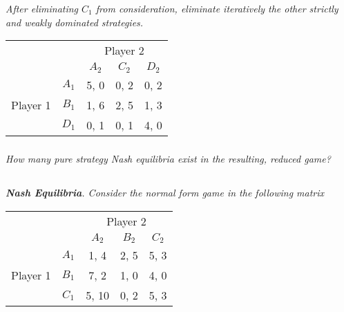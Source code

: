 \documentclass[12pt]{amsart}
\begin{document}
	\subsubsection{}
	\textit{After eliminating $C_1$ from consideration, eliminate iteratively the other strictly and
	weakly dominated strategies.}
	
	\begin{center}
		\def\arraystretch{1.25}%
		\begin{tabular}{ccccc}
			&                            & \multicolumn{3}{c}{Player 2}                                                         \\
			& \multicolumn{1}{c|}{}      & \multicolumn{1}{c|}{$A_2$} & \multicolumn{1}{c|}{$C_2$} & \multicolumn{1}{c|}{$D_2$} \\ \cline{2-5} 
			\multirow{3}{*}{Player 1} & \multicolumn{1}{c|}{$A_1$} & \multicolumn{1}{c|}{5, 0}  & \multicolumn{1}{c|}{0, 2}  & \multicolumn{1}{c|}{0, 2}  \\ \cline{2-5} 
			& \multicolumn{1}{c|}{$B_1$} & \multicolumn{1}{c|}{1, 6}  & \multicolumn{1}{c|}{2, 5}  & \multicolumn{1}{c|}{1, 3}  \\ \cline{2-5} 
			& \multicolumn{1}{c|}{$D_1$} & \multicolumn{1}{c|}{0, 1}  & \multicolumn{1}{c|}{0, 1}  & \multicolumn{1}{c|}{4, 0}  \\ \cline{2-5} 
		\end{tabular}
	\end{center}
 
	\subsubsection{}
	\textit{How many pure strategy Nash equilibria exist in the resulting, reduced game?}




\subsection{}
\textit{\textbf{Nash Equilibria}. Consider the normal form game in the following matrix}

\begin{center}
	\def\arraystretch{1.25}%
	\begin{tabular}{ccccc}
		&                            & \multicolumn{3}{c}{Player 2}                                                         \\
		& \multicolumn{1}{c|}{}      & \multicolumn{1}{c|}{$A_2$} & \multicolumn{1}{c|}{$B_2$} & \multicolumn{1}{c|}{$C_2$} \\ \cline{2-5} 
		& \multicolumn{1}{c|}{$A_1$} & \multicolumn{1}{c|}{1, 4}  & \multicolumn{1}{c|}{2, 5}  & \multicolumn{1}{c|}{5, 3}  \\ \cline{2-5} 
		Player 1 & \multicolumn{1}{c|}{$B_1$} & \multicolumn{1}{c|}{7, 2}  & \multicolumn{1}{c|}{1, 0}  & \multicolumn{1}{c|}{4, 0}  \\ \cline{2-5} 
		& \multicolumn{1}{c|}{$C_1$} & \multicolumn{1}{c|}{5, 10} & \multicolumn{1}{c|}{0, 2}  & \multicolumn{1}{c|}{5, 3}  \\ \cline{2-5} 
	\end{tabular} \\[2ex]
\end{center}
\end{document}
